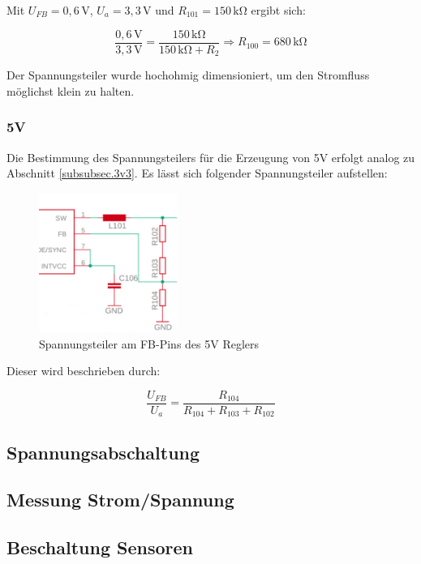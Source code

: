 Mit $U_{FB}=0,6\,\si{\volt}$, $U_a=3,3\,\si{\volt}$ und $R_{101}=150\,\si{\kilo\ohm}$ ergibt sich:

\begin{minipage}{\textwidth}
\begin{equation}\label{eq:Spannungsteiler3v3b}
\frac {0,6\,\si{\volt}}{3,3\,\si{\volt}}{=}  \frac{150\,\si{\kilo\ohm}}{150\,\si{\kilo\ohm}+R_2} \Rightarrow R_{100}=680\,\si{\kilo\ohm}
\end{equation}
\end{minipage}

Der Spannungsteiler wurde hochohmig dimensioniert, um den Stromfluss möglichst klein zu halten.


\subsubsection{5V}\label{subsubsec.5v}
Die Bestimmung des Spannungsteilers für die Erzeugung von 5V erfolgt analog zu Abschnitt \ref{subsubsec.3v3}. Es lässt sich folgender Spannungsteiler aufstellen:

\begin{figure}[H]
  \centering
  \includegraphics[width=0.4\textwidth]{./img/spannungsteiler_5v.png}
  \caption{Spannungsteiler am FB-Pins des 5V Reglers}\label{fig.spgsteiler5v}
\end{figure}

Dieser wird beschrieben durch:

\begin{minipage}{\textwidth}
\begin{equation}\label{eq:Spannungsteiler5v}
\frac {U_{FB}}{U_a}{=}  \frac{R_{104}}{R_{104}+R_{103}+R_{102}}
\end{equation}
\end{minipage}




\subsection{Spannungsabschaltung}\label{subsec.Spannungsabschaltung}

\subsection{Messung Strom/Spannung}\label{subsec.MessungStromSpannung}

\subsection{Beschaltung Sensoren}\label{subsec.BeschaltungSensoren}



